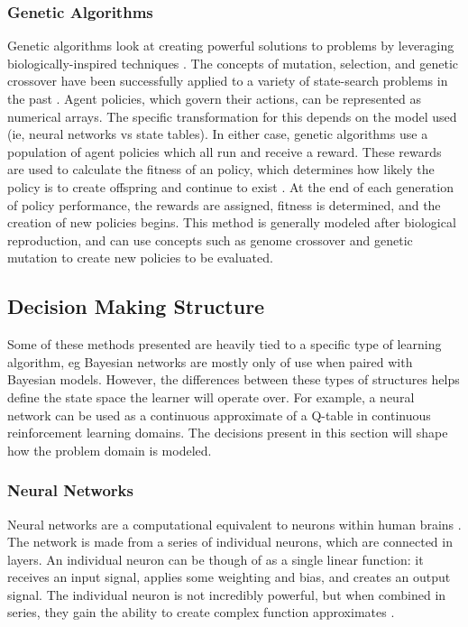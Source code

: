 \subsubsection{Genetic Algorithms}
Genetic algorithms look at creating powerful solutions to problems by leveraging biologically-inspired techniques \cite{RussellNorvig}.
The concepts of mutation, selection, and genetic crossover have been successfully applied to a variety of state-search problems in the past \cite{RussellNorvig}.
Agent policies, which govern their actions, can be represented as numerical arrays.
The specific transformation for this depends on the model used (ie, neural networks vs state tables).
In either case, genetic algorithms use a population of agent policies which all run and receive a reward.
These rewards are used to calculate the fitness of an policy, which determines how likely the policy is to create offspring and continue to exist \cite{RussellNorvig}.
At the end of each generation of policy performance, the rewards are assigned, fitness is determined, and the creation of new policies begins.
This method is generally modeled after biological reproduction, and can use concepts such as genome crossover and genetic mutation to create new policies to be evaluated.

\subsection{Decision Making Structure}
Some of these methods presented are heavily tied to a specific type of learning algorithm, eg Bayesian networks are mostly only of use when paired with Bayesian models.
However, the differences between these types of structures helps define the state space the learner will operate over.
For example, a neural network can be used as a continuous approximate of a Q-table in continuous reinforcement learning domains.
The decisions present in this section will shape how the problem domain is modeled.

\subsubsection{Neural Networks}
Neural networks are a computational equivalent to neurons within human brains \cite{SuttonBarto}.
The network is made from a series of individual neurons, which are connected in layers.
An individual neuron can be though of as a single linear function: it receives an input signal, applies some weighting and bias, and creates an output signal.
The individual neuron is not incredibly powerful, but when combined in series, they gain the ability to create complex function approximates \cite{SuttonBarto}.

